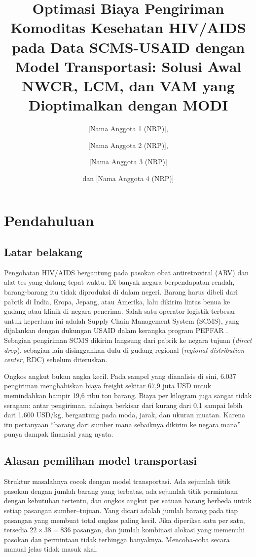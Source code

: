 \documentclass[a4paper,11pt]{article}
\title{\boldmath Optimasi Biaya Pengiriman Komoditas Kesehatan HIV/AIDS pada Data SCMS-USAID dengan Model Transportasi: Solusi Awal NWCR, LCM, dan VAM yang Dioptimalkan dengan MODI}
\author[a,1]{[Nama Anggota 1 (NRP)],\note{Penulis korespondensi.}}
\author[a]{[Nama Anggota 2 (NRP)],}
\author[a]{[Nama Anggota 3 (NRP)]}
\author[a]{dan [Nama Anggota 4 (NRP)]}
\affiliation[a]{[Nama Departemen], Institut Teknologi Sepuluh Nopember,\\Surabaya, Jawa Timur, Indonesia 60111}
\begin{document}
\maketitle
\flushbottom

\section{Pendahuluan}
\label{sec:pendahuluan}

\subsection{Latar belakang}
Pengobatan HIV/AIDS bergantung pada pasokan obat antiretroviral (ARV) dan alat tes yang datang tepat waktu. Di banyak negara berpendapatan rendah, barang-barang itu tidak diproduksi di dalam negeri. Barang harus dibeli dari pabrik di India, Eropa, Jepang, atau Amerika, lalu dikirim lintas benua ke gudang atau klinik di negara penerima. Salah satu operator logistik terbesar untuk keperluan ini adalah Supply Chain Management System (SCMS), yang dijalankan dengan dukungan USAID dalam kerangka program PEPFAR \cite{usaid2015}. Sebagian pengiriman SCMS dikirim langsung dari pabrik ke negara tujuan (\textit{direct drop}), sebagian lain disinggahkan dulu di gudang regional (\textit{regional distribution center}, RDC) sebelum diteruskan.

Ongkos angkut bukan angka kecil. Pada sampel yang dianalisis di sini, 6.037 pengiriman menghabiskan biaya freight sekitar 67,9 juta USD untuk memindahkan hampir 19,6 ribu ton barang. Biaya per kilogram juga sangat tidak seragam: antar pengiriman, nilainya berkisar dari kurang dari 0,1 sampai lebih dari 1.600 USD/kg, bergantung pada moda, jarak, dan ukuran muatan. Karena itu pertanyaan ``barang dari sumber mana sebaiknya dikirim ke negara mana'' punya dampak finansial yang nyata.

\subsection{Alasan pemilihan model transportasi}
Struktur masalahnya cocok dengan model transportasi. Ada sejumlah titik pasokan dengan jumlah barang yang terbatas, ada sejumlah titik permintaan dengan kebutuhan tertentu, dan ongkos angkut per satuan barang berbeda untuk setiap pasangan sumber--tujuan. Yang dicari adalah jumlah barang pada tiap pasangan yang membuat total ongkos paling kecil. Jika diperiksa satu per satu, tersedia $22\times38=836$ pasangan, dan jumlah kombinasi alokasi yang memenuhi pasokan dan permintaan tidak terhingga banyaknya. Mencoba-coba secara manual jelas tidak masuk akal.
\end{document}

